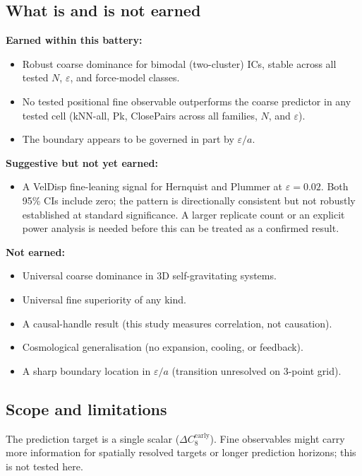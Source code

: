 \documentclass[11pt,a4paper]{article}
\newcommand{\dCearly}{\Delta C_{8}^{\mathrm{early}}}
\newcommand{\heps}{\varepsilon}
\begin{document}
\subsection{What is and is not earned}
\label{sec:discussion:scope}

\textbf{Earned within this battery:}
\begin{itemize}
  \item Robust coarse dominance for bimodal (two-cluster) ICs, stable
    across all tested $N$, $\heps$, and force-model classes.
  \item No tested positional fine observable outperforms the coarse predictor
    in any tested cell (kNN-all, Pk, ClosePairs across all families, $N$,
    and $\heps$).
  \item The boundary appears to be governed in part by $\heps/a$.
\end{itemize}

\textbf{Suggestive but not yet earned:}
\begin{itemize}
  \item A VelDisp fine-leaning signal for Hernquist and Plummer at
    $\heps = 0.02$.
    Both 95\% CIs include zero; the pattern is directionally consistent
    but not robustly established at standard significance.
    A larger replicate count or an explicit power analysis is needed
    before this can be treated as a confirmed result.
\end{itemize}

\textbf{Not earned:}
\begin{itemize}
  \item Universal coarse dominance in 3D self-gravitating systems.
  \item Universal fine superiority of any kind.
  \item A causal-handle result (this study measures correlation,
    not causation).
  \item Cosmological generalisation (no expansion, cooling, or feedback).
  \item A sharp boundary location in $\heps/a$ (transition unresolved
    on 3-point grid).
\end{itemize}

\subsection{Scope and limitations}

The prediction target is a single scalar ($\dCearly$).
Fine observables might carry more information for spatially resolved targets
or longer prediction horizons; this is not tested here.
\end{document}

